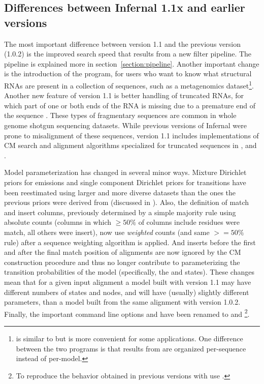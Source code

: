 \subsection{Differences between Infernal 1.1x and earlier versions}

The most important difference between version 1.1 and the previous
version (1.0.2) is the improved search speed that results from a new
filter pipeline. The pipeline is explained more in
section~\ref{section:pipeline}. Another important change is the
introduction of the  program, for users who want to know
what structural RNAs are present in a collection of sequences, such as
a metagenomics dataset\footnote{ is similar to
 but is more convenient for some applications. One
difference between the two programs is that results from 
are organized per-sequence instead of per-model.}. Another new feature
of version 1.1 is better handling of truncated RNAs, for which part of
one or both ends of the RNA is missing due to a premature end of the
sequence \citep{KolbeEddy09}. These types of fragmentary sequences are
common in whole genome shotgun sequencing datasets. While previous
versions of Infernal were prone to misalignment of these sequences,
version 1.1 includes implementations of CM search and alignment
algorithms specialized for truncated sequences \citep{KolbeEddy09} in
,  and .

Model parameterization has changed in several minor ways. Mixture
Dirichlet priors for emissions and single component Dirichlet priors
for transitions have been reestimated using larger and more diverse
datasets than the ones the previous priors were derived from
(discussed in \citep{NawrockiEddy07}). Also, the definition of match
and insert columns, previously determined by a simple majority rule
using absolute counts (columns in which $\geq 50\%$ of columns include
residues were match, all others were insert), now use \emph{weighted}
counts (and same $>=50\%$ rule) after a sequence weighting algorithm
is applied. And inserts before the first and after the final match
position of alignments are now ignored by the CM construction
procedure and thus no longer contribute to parameterizing the
transition probabilities of the model (specifically, the
 and  states). These changes mean
that for a given input alignment a model built with version 1.1 may
have different numbers of states and nodes, and will have (usually)
slightly different parameters, than a model built from the same
alignment with version 1.0.2.  Finally, the important 
command line options  and  have been
renamed to  and \footnote{To reproduce
the behavior obtained in previous versions with 
use .}.

